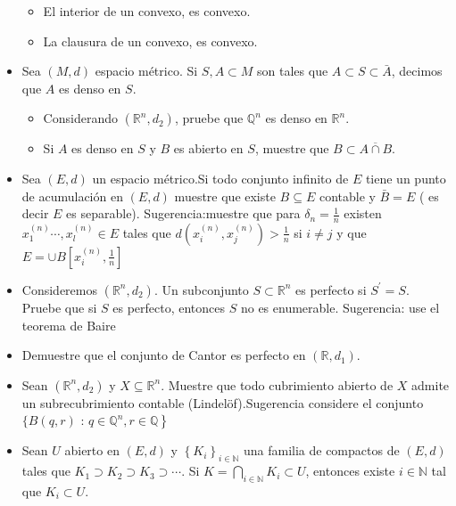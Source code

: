 \begin{itemize}[leftmargin=*]
\begin{itemize}
            \item El interior de un convexo, es convexo.
            
            \item La clausura de un convexo, es convexo.
            \end{itemize}

        \item Sea $(M, d)$ espacio métrico. Si $S, A \subset M$ son tales que $A \subset S \subset \bar{A}$, decimos que $A$ es denso en $S$.
        
        \begin{itemize}
        
        \item Considerando $\left(\mathbb{R}^n, d_2\right)$, pruebe que $\mathbb{Q}^n$ es denso en $\mathbb{R}^n$.
        
        \item Si $A$ es denso en $S$ y $B$ es abierto en $S$, muestre que $B \subset \overline{A \cap B}$.
        
    \end{itemize}
    
    \item Sea $(E, d)$ un espacio métrico.Si todo conjunto infinito de $E$ tiene un punto de acumulación en $(E, d)$ muestre que existe $B \subseteq E$ contable y $\bar{B}=E$ ( es decir $E$ es separable). Sugerencia:muestre que para $\delta_n=\frac{1}{n}$ existen $x_1^{(n)} \cdots, x_l^{(n)} \in E$ tales que $d\left(x_i^{(n)}, x_j^{(n)}\right)>\frac{1}{n}$ si $i \neq j$ y que $E=\cup B\left[x_i^{(n)}, \frac{1}{n}\right]$

    \item Consideremos $\left(\mathbb{R}^n, d_2\right)$. Un subconjunto $S \subset \mathbb{R}^n$ es perfecto si $S^{\prime}=S$. Pruebe que si $S$ es perfecto, entonces $S$ no es enumerable. Sugerencia: use el teorema de Baire

    \item Demuestre que el conjunto de Cantor es perfecto en $\left(\mathbb{R}, d_1\right)$.
    
    \item Sean $\left(\mathbb{R}^n, d_2\right)$ y $X \subseteq \mathbb{R}^n$. Muestre que todo cubrimiento abierto de $X$ admite un subrecubrimiento contable (Lindelöf).Sugerencia considere el conjunto $\{B(q, r)$ : $\left.q \in \mathbb{Q}^n, r \in \mathbb{Q}\right\}$
    
    \item Sean $U$ abierto en $(E, d)$ y $\left\{K_i\right\}_{i \in \mathbb{N}}$ una familia de compactos de $(E, d)$ tales que $K_1 \supset K_2 \supset K_3 \supset \cdots$. Si $K=\bigcap_{i \in \mathbb{N}} K_i \subset U$, entonces existe $i \in \mathbb{N}$ tal que $K_i \subset U$.
    

\end{itemize}
